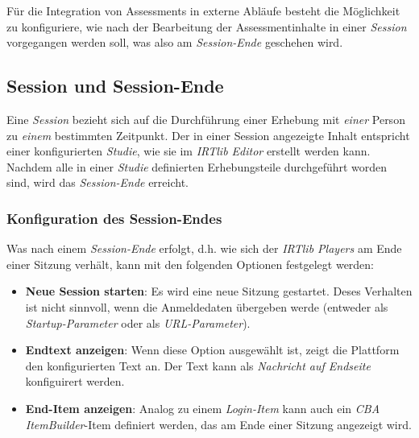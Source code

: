 \documentclass[
  letterpaper,
  DIV=11]{scrreprt}
\begin{document}
Für die Integration von Assessments in externe Abläufe besteht die
Möglichkeit zu konfiguriere, wie nach der Bearbeitung der
Assessmentinhalte in einer \emph{Session} vorgegangen werden soll, was
also am \emph{Session-Ende} geschehen wird.

\begin{tcolorbox}[enhanced jigsaw, colbacktitle=quarto-callout-tip-color!10!white, coltitle=black, colframe=quarto-callout-tip-color-frame, leftrule=.75mm, breakable, opacitybacktitle=0.6, toprule=.15mm, title=\textcolor{quarto-callout-tip-color}{\faLightbulb}\hspace{0.5em}{Eingebettete Programmhilfe}, colback=white, titlerule=0mm, arc=.35mm, bottomtitle=1mm, toptitle=1mm, rightrule=.15mm, bottomrule=.15mm, left=2mm, opacityback=0]

\hypertarget{session-und-session-ende-1}{%
\subsection{Session und Session-Ende}\label{session-und-session-ende-1}}

Eine \emph{Session} bezieht sich auf die Durchführung einer Erhebung mit
\emph{einer} Person zu \emph{einem} bestimmten Zeitpunkt. Der in einer
Session angezeigte Inhalt entspricht einer konfigurierten \emph{Studie},
wie sie im \emph{IRTlib Editor} erstellt werden kann. Nachdem alle in
einer \emph{Studie} definierten Erhebungsteile durchgeführt worden sind,
wird das \emph{Session-Ende} erreicht.

\hypertarget{konfiguration-des-session-endes-1}{%
\subsubsection{Konfiguration des
Session-Endes}\label{konfiguration-des-session-endes-1}}

Was nach einem \emph{Session-Ende} erfolgt, d.h. wie sich der
\emph{IRTlib Players} am Ende einer Sitzung verhält, kann mit den
folgenden Optionen festgelegt werden:

\begin{itemize}
\item
  \textbf{Neue Session starten}: Es wird eine neue Sitzung gestartet.
  Deses Verhalten ist nicht sinnvoll, wenn die Anmeldedaten übergeben
  werde (entweder als \emph{Startup-Parameter} oder als
  \emph{URL-Parameter}).
\item
  \textbf{Endtext anzeigen}: Wenn diese Option ausgewählt ist, zeigt die
  Plattform den konfigurierten Text an. Der Text kann als
  \emph{Nachricht auf Endseite} konfiguirert werden.
\item
  \textbf{End-Item anzeigen}: Analog zu einem \emph{Login-Item} kann
  auch ein \emph{CBA ItemBuilder}-Item definiert werden, das am Ende
  einer Sitzung angezeigt wird.
\end{itemize}


\end{tcolorbox}
\end{document}
